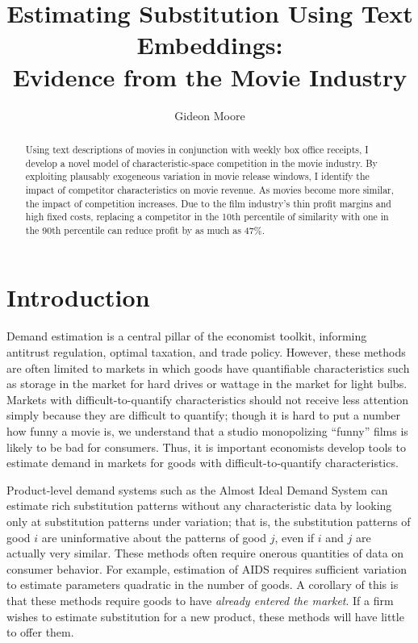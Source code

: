\documentclass{article}
\author{Gideon Moore}
\title{Estimating Substitution Using Text Embeddings: \\ Evidence from the Movie Industry}
\begin{document}
\maketitle 

\begin{abstract}
    Using text descriptions of movies in conjunction with weekly box office receipts, I develop a novel model of characteristic-space competition in the movie industry. By exploiting plausably exogeneous variation in movie release windows, I identify the impact of competitor characteristics on movie revenue. As movies become more similar, the impact of competition increases. Due to the film industry's thin profit margins and high fixed costs, replacing a competitor in the 10th percentile of similarity with one in the 90th percentile can reduce profit by as much as 47\%. 
\end{abstract}

\section{Introduction}

Demand estimation is a central pillar of the economist toolkit, informing antitrust regulation, optimal taxation, and trade policy. However, these methods are often limited to markets in which goods have quantifiable characteristics such as storage in the market for hard drives or wattage in the market for light bulbs. Markets with difficult-to-quantify characteristics should not receive less attention simply because they are difficult to quantify; though it is hard to put a number how funny a movie is, we understand that a studio monopolizing ``funny'' films is likely to be bad for consumers. Thus, it is important economists develop tools to estimate demand in markets for goods with difficult-to-quantify characteristics.

Product-level demand systems such as the Almost Ideal Demand System \parencite{deaton1980AER} can estimate rich substitution patterns without any characteristic data by looking only at substitution patterns under variation; that is, the substitution patterns of good $i$ are uninformative about the patterns of good $j$, even if $i$ and $j$ are actually very similar. These methods often require onerous quantities of data on consumer behavior. For example, estimation of AIDS requires sufficient variation to estimate parameters quadratic in the number of goods. A corollary of this is that these methods require goods to have \emph{already entered the market}. If a firm wishes to estimate substitution for a new product, these methods will have little to offer them.
\end{document}
